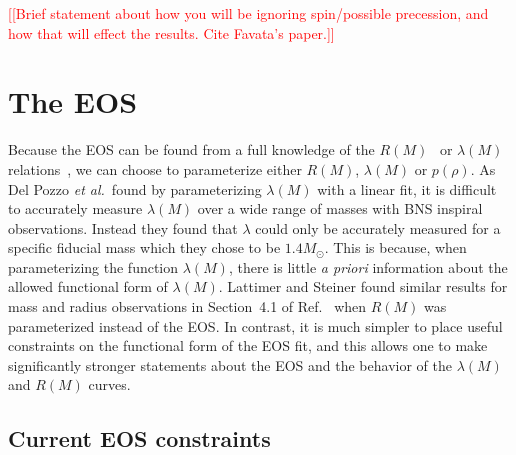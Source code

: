 \documentclass[twocolumn,prd,amssymb,aps,nofootinbib,showpacs,epsf]{revtex4}
\newcommand{\red}{\textcolor{red}}
\begin{document}
\red{[[Brief statement about how you will be ignoring spin/possible precession, and how that will effect the results. Cite Favata's paper.]]}


\section{The EOS}
\label{sec:eos}

Because the EOS can be found from a full knowledge of the $R(M)$~\cite{Lindblom1992} or $\lambda(M)$ relations~\cite{LindblomIndik2012, LindblomIndik2014}, we can choose to parameterize either $R(M)$, $\lambda(M)$ or $p(\rho)$. As Del Pozzo {\it et al.}\ found by parameterizing $\lambda(M)$ with a linear fit, it is difficult to accurately measure $\lambda(M)$ over a wide range of masses with BNS inspiral observations. Instead they found that $\lambda$ could only be accurately measured for a specific fiducial mass which they chose to be $1.4M_\odot$. This is because, when parameterizing the function $\lambda(M)$, there is little {\it a priori} information about the allowed functional form of $\lambda(M)$. Lattimer and Steiner found similar results for mass and radius observations in Section~4.1 of Ref.~\cite{LattimerSteiner2014} when $R(M)$ was parameterized instead of the EOS. In contrast, it is much simpler to place useful constraints on the functional form of the EOS fit, and this allows one to make significantly stronger statements about the EOS and the behavior of the $\lambda(M)$ and $R(M)$ curves.

\subsection{Current EOS constraints}
\label{sec:eosconstraints}
\end{document}
